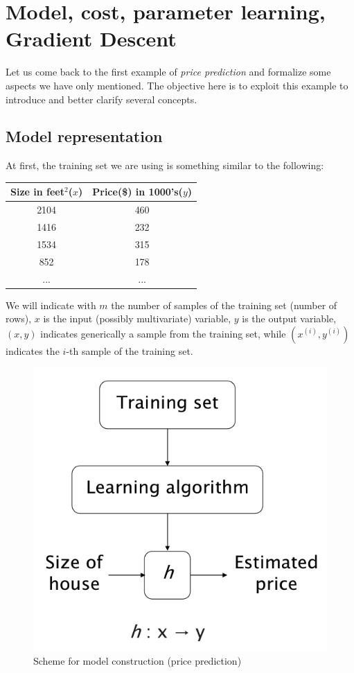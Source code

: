 \chapter{Model, cost, parameter learning, Gradient Descent }
Let us come back to the first example of \textit{price prediction} and formalize some aspects we have only mentioned. The objective here is to exploit this example to introduce and better clarify several concepts.\\
\section{Model representation}
At first, the training set we are using is something similar to the following:

\begin{table}[h]
    \centering
    \begin{tabular}{c c}
        \textbf{Size in feet$^2$($x$)}&\textbf{\color{red}Price(\$) in 1000's($y$)}\\
        \hline
        2104&460\\
        1416&232\\
        1534&315\\
        852&178\\
        ...&...
    \end{tabular}
\end{table}
\noindent
We will indicate with $m$ the number of samples of the training set (number of rows), $x$ is the input (possibly multivariate) variable, $y$ is the output variable, $(x,y)$ indicates generically a sample from the training set, while $(x^{(i)}, y^{(i)})$ indicates the $i$-th sample of the training set.

\begin{figure}[h]
    \centering
    \label{}
    \includegraphics[scale=0.5]{img/model.png}
    \caption{Scheme for model construction (price prediction)}
\end{figure}

